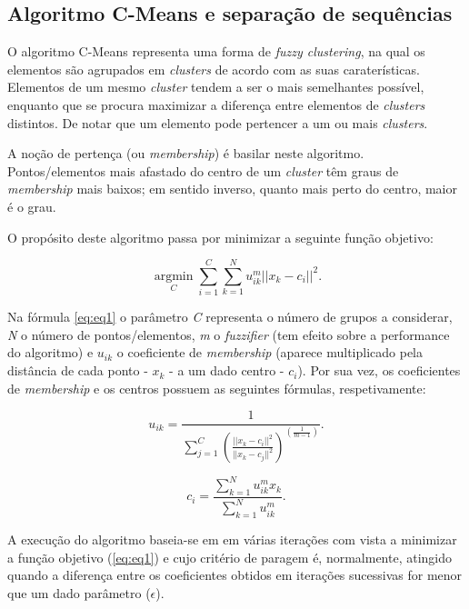 \subsection{Algoritmo C-Means e separação de sequências}
\label{chap3:subsec:cmeans}
O algoritmo C-Means representa uma forma de \textit{fuzzy clustering}, na qual os elementos são agrupados em \textit{clusters} de acordo com as suas caraterísticas. Elementos de um mesmo \textit{cluster} tendem a ser o mais semelhantes possível, enquanto que se procura maximizar a diferença entre elementos de \textit{clusters} distintos. De notar que um elemento pode pertencer a um ou mais \textit{clusters}.

\noindent A noção de pertença (ou \textit{membership}) é basilar neste algoritmo. Pontos/elementos mais afastado do centro de um \textit{cluster} têm graus de \textit{membership} mais baixos; em sentido inverso, quanto mais perto do centro, maior é o grau. 

\noindent O propósito deste algoritmo passa por minimizar a seguinte função objetivo:

\begin{equation}
 \operatorname*{argmin}_C\sum_{i=1}^{C}\sum_{k=1}^{N}u_{ik}^m||x_k-c_i||^2.
 \label{eq:eq1}
\end{equation}

\noindent Na fórmula \ref{eq:eq1} o parâmetro \emph{C} representa o número de grupos a considerar, \emph{N} o número de pontos/elementos, \emph{m} o \textit{fuzzifier} (tem efeito sobre a performance do algoritmo) e \emph{$u_{ik}$} o coeficiente de \textit{membership} (aparece multiplicado pela distância de cada ponto - \emph{$x_k$} - a um dado centro - \emph{$c_i$}). Por sua vez, os coeficientes de \textit{membership} e os centros possuem as seguintes fórmulas, respetivamente:

\begin{equation}
u_{ik} = \frac{1}{\sum_{j=1}^{C}{\left( \frac{||x_k-c_i||^2}{||x_k-c_j||^2} \right)}^{\left( \frac{1}{m-1}\right)}}.
 \label{eq:eq2}
\end{equation}

\begin{equation}
c_{i} = \frac{\sum_{k=1}^{N}{u_{ik}^{m}x_k}}{\sum_{k=1}^{N}{u_{ik}^{m}}}.
 \label{eq:eq3}
\end{equation}

\noindent A execução do algoritmo baseia-se em em várias iterações com vista a minimizar a função objetivo (\ref{eq:eq1}) e cujo critério de paragem é, normalmente, atingido quando a diferença entre os coeficientes obtidos em iterações sucessivas for menor que um dado parâmetro (\emph{$\epsilon$}).

